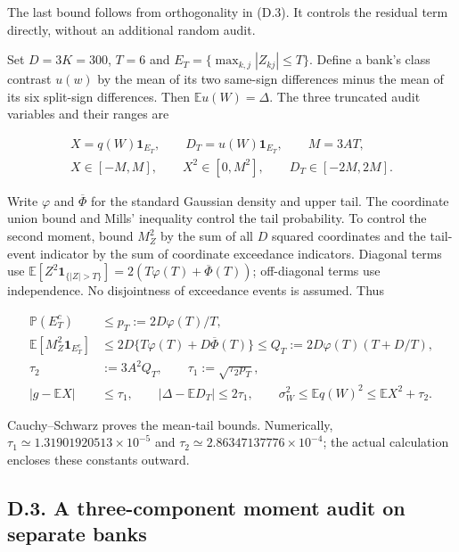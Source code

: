 \documentclass{article}
\begin{document}
The last bound follows from orthogonality in (D.3). It controls the
residual term directly, without an additional random audit.

Set \(D=3K=300\), \(T=6\) and \(E_T=\{\max_{k,j}|Z_{kj}|\le T\}\).
Define a bank's class contrast \(u(w)\) by the mean of its two same-sign
differences minus the mean of its six split-sign differences. Then
\(\mathbb Eu(W)=\Delta\). The three truncated audit variables and their
ranges are

\[
\begin{gathered}
X=q(W)\mathbf1_{E_T},\qquad
D_T=u(W)\mathbf1_{E_T},\qquad M=3AT,\\
X\in[-M,M],\qquad X^2\in[0,M^2],\qquad D_T\in[-2M,2M].
\end{gathered}
\tag{D.6}
\]

Write \(\varphi\) and \(\overline\Phi\) for the standard Gaussian
density and upper tail. The coordinate union bound and Mills' inequality
control the tail probability. To control the second moment, bound
\(M_Z^2\) by the sum of all \(D\) squared coordinates and the tail-event
indicator by the sum of coordinate exceedance indicators. Diagonal terms
use
\(\mathbb E[Z^2\mathbf1_{\{|Z|>T\}}]=2(T\varphi(T)+\overline\Phi(T))\);
off-diagonal terms use independence. No disjointness of exceedance
events is assumed. Thus

\[
\begin{aligned}
\mathbb P(E_T^c)&\le p_T:=2D\varphi(T)/T,\\
\mathbb E[M_Z^2\mathbf1_{E_T^c}]
&\le2D\{T\varphi(T)+D\overline\Phi(T)\}
\le Q_T:=2D\varphi(T)(T+D/T),\\
\tau_2&:=3A^2Q_T,\qquad \tau_1:=\sqrt{\tau_2p_T},\\
|g-\mathbb EX|&\le\tau_1,\qquad
|\Delta-\mathbb ED_T|\le2\tau_1,\qquad
\sigma_W^2\le\mathbb E q(W)^2\le\mathbb EX^2+\tau_2.
\end{aligned}
\tag{D.7}
\]

Cauchy--Schwarz proves the mean-tail bounds. Numerically,
\(\tau_1\simeq1.31901920513\times10^{-5}\) and
\(\tau_2\simeq2.86347137776\times10^{-4}\); the actual calculation
encloses these constants outward.

\subsection*{D.3. A three-component moment audit on separate
banks}\label{d.3.-a-three-component-moment-audit-on-separate-banks}
\end{document}
